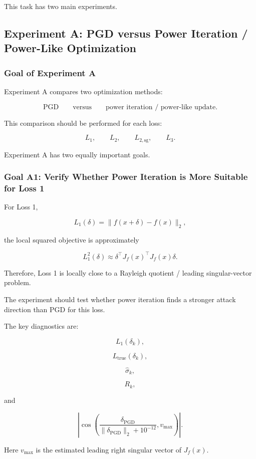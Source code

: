 \documentclass{article}
\begin{document}
This task has two main experiments.

\subsection{Experiment A: PGD versus Power Iteration / Power-Like Optimization}

\subsubsection{Goal of Experiment A}

Experiment A compares two optimization methods:

\[
\text{PGD}
\qquad
\text{versus}
\qquad
\text{power iteration / power-like update}.
\]

This comparison should be performed for each loss:

\[
L_1,
\qquad
L_2,
\qquad
L_{2,\mathrm{sg}},
\qquad
L_3.
\]

Experiment A has two equally important goals.

\subsubsection{Goal A1: Verify Whether Power Iteration is More Suitable for Loss 1}

For Loss 1,

\[
L_1(\delta)
=
\|f(x+\delta)-f(x)\|_2,
\]

the local squared objective is approximately

\[
L_1^2(\delta)
\approx
\delta^\top J_f(x)^\top J_f(x)\delta.
\]

Therefore, Loss 1 is locally close to a Rayleigh quotient / leading singular-vector problem.

The experiment should test whether power iteration finds a stronger attack direction than PGD for this loss.

The key diagnostics are:

\[
L_1(\delta_k),
\]

\[
L_{\mathrm{true}}(\delta_k),
\]

\[
\hat{\sigma}_k,
\]

\[
R_k,
\]

and

\[
\left|
\cos
\left(
\frac{\delta_{\mathrm{PGD}}}{\|\delta_{\mathrm{PGD}}\|_2+10^{-12}},
v_{\max}
\right)
\right|.
\]

Here \(v_{\max}\) is the estimated leading right singular vector of \(J_f(x)\).
\end{document}
